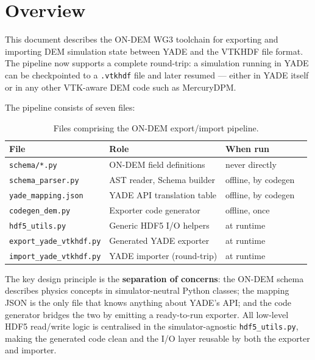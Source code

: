 \documentclass[11pt,a4paper]{article}
\begin{document}
\tableofcontents
\clearpage

\section{Overview}
\label{sec:overview}

This document describes the ON-DEM WG3 toolchain for exporting and importing
DEM simulation state between YADE and the VTKHDF file format. The pipeline
now supports a complete round-trip: a simulation running in YADE can be
checkpointed to a \texttt{.vtkhdf} file and later resumed — either in YADE
itself or in any other VTK-aware DEM code such as MercuryDPM.

The pipeline consists of seven files:

\begin{table}[htbp]
\centering
\begin{tabular}{llll}
\toprule
\sffamily\textbf{File} & \sffamily\textbf{Role} & \sffamily\textbf{When run} \\
\midrule
\texttt{schema/*.py}                    & ON-DEM field definitions      & never directly \\
\texttt{schema\_parser.py}              & AST reader, Schema builder    & offline, by codegen \\
\texttt{yade\_mapping.json}             & YADE API translation table    & offline, by codegen \\
\texttt{codegen\_dem.py}                & Exporter code generator       & offline, once \\
\texttt{hdf5\_utils.py}                 & Generic HDF5 I/O helpers      & at runtime \\
\texttt{export\_yade\_vtkhdf.py}        & Generated YADE exporter       & at runtime \\
\texttt{import\_yade\_vtkhdf.py}        & YADE importer (round-trip)    & at runtime \\
\bottomrule
\end{tabular}
\caption{Files comprising the ON-DEM export/import pipeline.}
\end{table}

The key design principle is the \textbf{separation of concerns}: the
ON-DEM schema describes physics concepts in simulator-neutral Python classes;
the mapping JSON is the only file that knows anything about YADE's API; and
the code generator bridges the two by emitting a ready-to-run exporter.
All low-level HDF5 read/write logic is centralised in the simulator-agnostic
\texttt{hdf5\_utils.py}, making the generated code clean and the I/O layer
reusable by both the exporter and importer.
\end{document}
